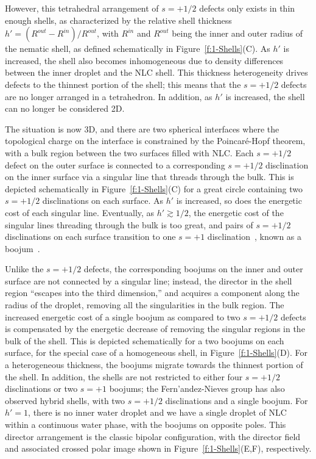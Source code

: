However, this tetrahedral arrangement of $s = +1/2$ defects only exists in thin enough shells, as characterized by the relative shell thickness $h' = (R^{out}-R^{in})/R^{out}$, with $R^{in}$ and $R^{out}$ being the inner and outer radius of the nematic shell, as defined schematically in Figure~\ref{f:1-Shells}(C).
As $h'$ is increased, the shell also becomes inhomogeneous due to density differences between the inner droplet and the NLC shell.
This thickness heterogeneity drives defects to the thinnest portion of the shell; this means that the $s = +1/2$ defects are no longer arranged in a tetrahedron.
In addition, as $h'$ is increased, the shell can no longer be considered 2D.

The situation is now 3D, and there are two spherical interfaces where the topological charge on the interface is constrained by the Poincar\'e-Hopf theorem, with a bulk region between the two surfaces filled with NLC.
Each $s = +1/2$ defect on the outer surface is connected to a corresponding $s = +1/2$ disclination on the inner surface via a singular line that threads through the bulk.
This is depicted schematically in Figure~\ref{f:1-Shells}(C) for a great circle containing two $s = +1/2$ disclinations on each surface.
As $h'$ is increased, so does the energetic cost of each singular line.
Eventually, as $h'\gtrsim 1/2$, the energetic cost of the singular lines threading through the bulk is too great, and pairs of $s = +1/2$ disclinations on each surface transition to one $s = +1$ disclination~\cite{RN105}, known as a boojum~\cite{RN273}.

Unlike the $s = +1/2$ defects, the corresponding boojums on the inner and outer surface are not connected by a singular line; instead, the director in the shell region ``escapes into the third dimension,'' and acquires a component along the radius of the droplet, removing all the singularities in the bulk region.
The increased energetic cost of a single boojum as compared to two $s = +1/2$ defects is compensated by the energetic decrease of removing the singular regions in the bulk of the shell.
This is depicted schematically for a two boojums on each surface, for the special case of a homogeneous shell, in Figure~\ref{f:1-Shells}(D).
For a heterogeneous thickness, the boojums migrate towards the thinnest portion of the shell.
In addition, the shells are not restricted to either four $s = +1/2$ disclinations or two $s = +1$ boojums; the Fern'andez-Nieves group has also observed hybrid shells, with two $s = +1/2$ disclinations and a single boojum.
For $h' = 1$, there is no inner water droplet and we have a single droplet of NLC within a continuous water phase, with the boojums on opposite poles.
This director arrangement is the classic bipolar configuration, with the director field and associated crossed polar image shown in Figure~\ref{f:1-Shells}(E,F), respectively.

